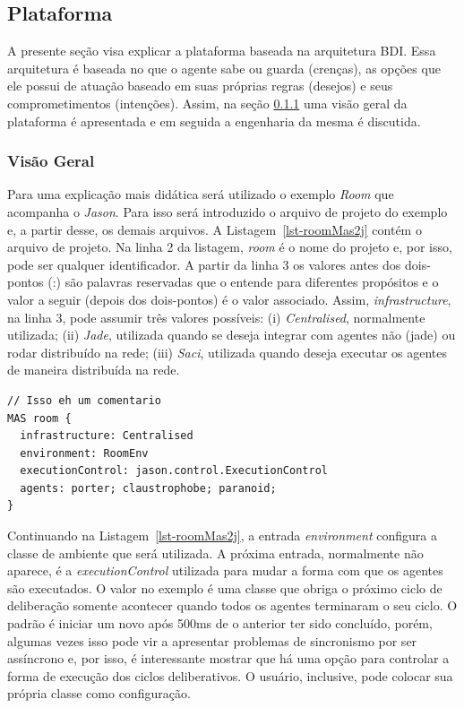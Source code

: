 \subsection{Plataforma \jason} \label{sec:aoppj}

A presente seção visa explicar a plataforma \jason baseada na arquitetura BDI.
Essa arquitetura é baseada no que o agente sabe ou guarda (crenças), as opções
que ele possui de atuação baseado em suas próprias regras (desejos) e seus
comprometimentos (intenções). Assim, na seção \ref{sec-jason-overview} uma
visão geral da plataforma é apresentada e em seguida a engenharia da mesma é
discutida.

\subsubsection{Visão Geral} \label{sec-jason-overview}

Para uma explicação mais didática será utilizado o exemplo \emph{Room} que
acompanha o \emph{Jason}. Para isso será introduzido
o arquivo de projeto do exemplo e, a partir desse, os demais arquivos.
A Listagem~\ref{lst-roomMas2j} contém o arquivo de projeto.
Na linha 2 da listagem, \emph{room} é o nome do projeto e, por isso, pode ser qualquer
identificador. A partir da linha 3 os valores antes dos dois-pontos (:)
são palavras reservadas que o \jason entende para diferentes propósitos e o valor
a seguir (depois dos dois-pontos) é o valor associado.
Assim, \emph{infrastructure}, na linha 3, pode assumir três valores
possíveis: (i) \emph{Centralised}, normalmente utilizada;
(ii) \emph{Jade}, utilizada quando se deseja integrar
com agentes não \jason (jade) ou rodar distribuído na rede; (iii) \emph{Saci}, utilizada
quando deseja executar os agentes de maneira distribuída na rede.

\begin{center}
    \begin{minipage}{120mm}
	\lstset{linewidth=120mm}
	\begin{lstlisting}[frame=trbl, caption=Arquivo de projeto do \jason para o exemplo \emph{Room}, label=lst-roomMas2j]
// Isso eh um comentario
MAS room {
  infrastructure: Centralised
  environment: RoomEnv
  executionControl: jason.control.ExecutionControl
  agents: porter; claustrophobe; paranoid;
}
	\end{lstlisting}
    \end{minipage}
\end{center}

Continuando na Listagem~\ref{lst-roomMas2j}, a entrada \emph{environment}
configura a classe de ambiente que será utilizada. A próxima entrada,
normalmente não aparece, é a \emph{executionControl} utilizada para
mudar a forma com que os agentes são executados. O valor no exemplo é uma
classe que obriga o próximo ciclo de deliberação somente acontecer quando
todos os agentes terminaram o seu ciclo. O padrão é iniciar um novo
após 500ms de o anterior ter sido concluído, porém, algumas vezes isso
pode vir a apresentar problemas de sincronismo por ser assíncrono e, por isso, é interessante
mostrar que há uma opção para controlar a forma de execução dos ciclos
deliberativos. O usuário, inclusive, pode colocar sua própria classe como
configuração.

